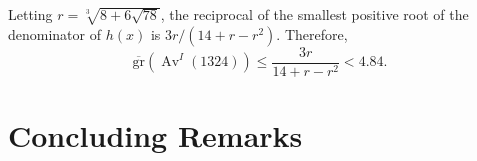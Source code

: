 \documentclass[10pt]{article}
\theoremstyle{plain}
\newcommand{\Av}{\operatorname{Av}}
\newcommand{\ds}{\displaystyle}
\newcommand{\f}[2]{\ds\frac{{#1}}{{#2}}}
\newcommand{\ugr}{\overline{\mathrm{gr}}}
\renewcommand{\a}{\mathsf{a}}
\renewcommand{\b}{\mathsf{b}}
\renewcommand{\c}{\mathsf{c}}
\renewcommand{\d}{\mathsf{d}}
\begin{document}

Letting $r = \sqrt[3]{8+6\sqrt{78}}$, the reciprocal of the smallest positive root of the denominator of $h(x)$ is $3r/(14+r-r^2)$. Therefore,
	\[\ugr(\Av^I(1324)) \leq \f{3r}{14+r-r^2} < 4.84.\]


%
%
%
%
%
%
%
%
%
%

\section{Concluding Remarks}
\end{document}
